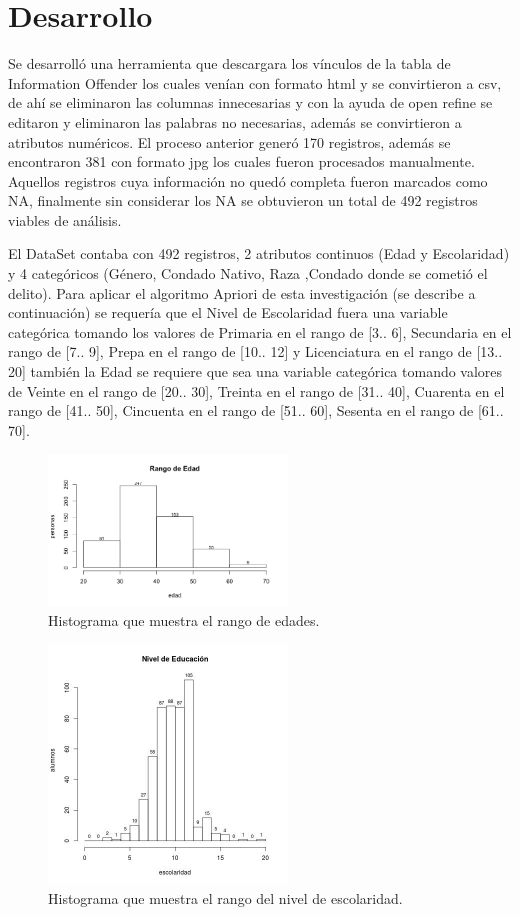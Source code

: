 \documentclass[sigconf]{acmart}
\begin{document}
\section{Desarrollo}
Se desarrolló una herramienta que descargara los vínculos de la tabla de Information Offender los cuales venían con formato html y se convirtieron a csv, de ahí se eliminaron las columnas innecesarias y con la ayuda de open refine se editaron y eliminaron las palabras no necesarias, además se convirtieron a atributos numéricos. El proceso anterior generó 170 registros, además se encontraron 381 con formato jpg los cuales fueron procesados manualmente.
Aquellos registros cuya información no quedó completa fueron marcados como NA, finalmente sin considerar los NA se obtuvieron un total de 492 registros viables de análisis.


El DataSet contaba con 492 registros, 2 atributos continuos (Edad y Escolaridad) y 4 categóricos (Género, Condado Nativo, Raza ,Condado donde se cometió el delito). Para aplicar el algoritmo Apriori de esta investigación (se describe a continuación) se requería que el Nivel de Escolaridad fuera una variable categórica tomando los valores de Primaria en el rango de [3.. 6], Secundaria en el rango de  [7.. 9], Prepa en el rango de  [10.. 12] y Licenciatura en el rango de  [13.. 20] también la Edad se requiere que sea una variable categórica tomando valores de Veinte en el rango de [20.. 30], Treinta en el rango de [31.. 40], Cuarenta en el rango de [41.. 50], Cincuenta en el rango de [51.. 60], Sesenta en el rango de [61.. 70].


\begin{figure}[ht]
  \centering
  \includegraphics[width=2.5in]{Rplot.png}
  \caption{Histograma que muestra el rango de edades.}
  \label{fig:rangoEdad}
\end{figure}

\begin{figure}[ht]
  \centering
  \includegraphics[width=2.5in]{escolaridad.jpg}
  \caption{Histograma que muestra el rango del nivel de  escolaridad.}
  \label{fig:rangoEscolaridad}
\end{figure}
\end{document}
